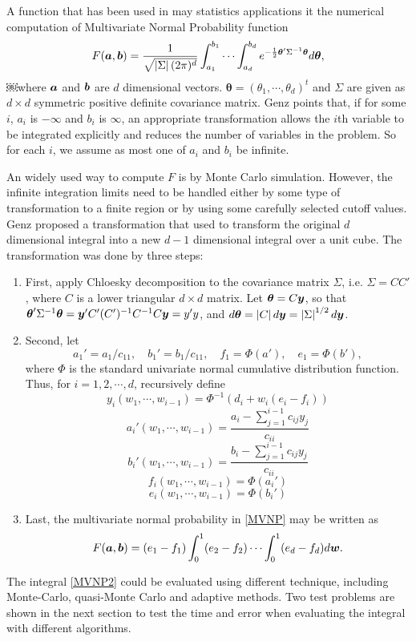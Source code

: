 \documentclass{iitthesis}
\theoremstyle{definition}
\begin{document}
A function that has been used in may statistics applications it the numerical computation of Multivariate Normal Probability function 
\begin{equation}\label{MVNP}
F(\boldsymbol{a},\boldsymbol{b}) = \frac{1}{\sqrt{\left \lvert \Sigma \right \rvert(2\pi)^d}}\int_{a_1}^{b_1}\cdots\int_{a_d}^{b_d} e^{-\frac{1}{2} \boldsymbol{\theta}'\Sigma^{-1}\boldsymbol{\theta} }d\boldsymbol{\theta},
\end{equation}
￼where $\boldsymbol{a}$ and $\boldsymbol{b}$ are $d$ dimensional vectors. $\boldsymbol{\theta} = (\theta_1,\cdots,\theta_d)^t$ and $\Sigma$ are given as $d \times d$ symmetric positive definite covariance matrix. Genz \cite{Genz92} points that, if for some $i$, $a_i$ is $-\infty$ and $b_i$ is $\infty$, an appropriate transformation allows the $i$th variable to be integrated explicitly and reduces the number of variables in the problem. So for each $i$, we assume as most one of $a_i$ and $b_i$ be infinite. 

An widely used way to compute $F$ is by Monte Carlo simulation. However, the infinite integration limits need to be handled either by some type of transformation to a finite region or by using some carefully selected cutoff values. Genz\cite{Genz92, GenzBretz02} proposed a transformation that used to transform the original $d$ dimensional integral into a new $d-1$ dimensional integral over a unit cube. The transformation was done by three steps:
\begin{enumerate}
\item First, apply Chloesky decomposition to the covariance matrix $\Sigma$, i.e. $\Sigma = CC'$, where $C$ is a lower triangular $d \times d$ matrix. Let $\boldsymbol{\theta}=C \boldsymbol{y}$, so that $\boldsymbol{\theta}'\Sigma^{-1}\boldsymbol{\theta} = \boldsymbol{y}' C'(C')^{-1} C^{-1}C\boldsymbol{y} =y'y$, and $d\boldsymbol{\theta}=\left \lvert C \right \rvert d\boldsymbol{y} = \left \lvert \Sigma \right \rvert^{1/2} d\boldsymbol{y}$.
\item Second, let
$$a_1'=a_1/c_{11}, \quad b_1'=b_1/c_{11}, \quad f_1=\Phi(a'), \quad  e_1 = \Phi(b'),$$
where $\Phi$ is the standard univariate normal cumulative distribution function. 
Thus, for $i=1,2,\cdots,d$, recursively define
$$y_{i}(w_1,\cdots,w_{i-1}) = \Phi^{-1} (d_i+w_i(e_i-f_i))$$
$$a_i'(w_1,\cdots,w_{i-1}) = \frac{a_i-\sum_{j=1}^{i-1} c_{ij}y_j}{c_{ii}}$$
$$b_i'(w_1,\cdots,w_{i-1}) = \frac{b_i-\sum_{j=1}^{i-1} c_{ij}y_j}{c_{ii}}$$
$$f_i(w_1,\cdots,w_{i-1}) = \Phi(a_i')$$
$$e_i(w_1,\cdots,w_{i-1}) = \Phi(b_i')$$
\item Last, the multivariate normal probability in \eqref{MVNP} may be written as 
\begin{equation}\label{MVNP2}
F(\boldsymbol{a},\boldsymbol{b}) = (e_1-f_1)\int_0^1 (e_2-f_2) \cdots \int_0^1(e_d-f_d)d\boldsymbol{w}.
\end{equation}
\end{enumerate}
The integral \eqref{MVNP2} could be evaluated using different technique, including Monte-Carlo, quasi-Monte Carlo and adaptive methods. Two test problems are shown in the next section to test the time and error when evaluating the integral with different algorithms.
\end{document}

